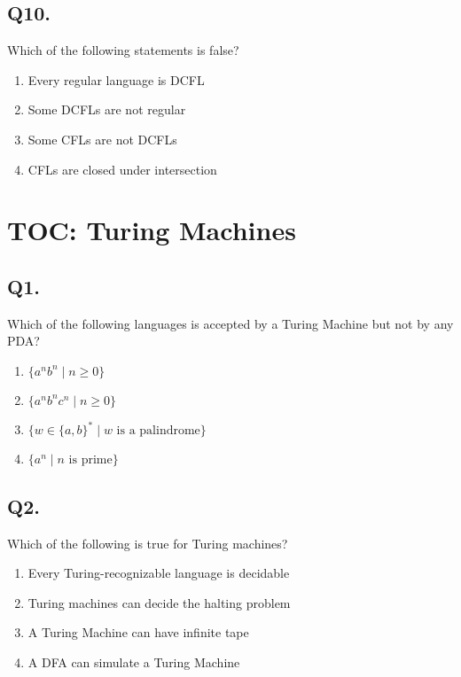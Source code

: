 \vspace{1em}

\subsection*{Q10.}
Which of the following statements is false?

\begin{enumerate}[label=(\alph*)]
    \item Every regular language is DCFL  
    \item Some DCFLs are not regular  
    \item Some CFLs are not DCFLs  
    \item CFLs are closed under intersection  
\end{enumerate}


\section{TOC: Turing Machines}

\subsection*{Q1.}
Which of the following languages is accepted by a Turing Machine but not by any PDA?

\begin{enumerate}[label=(\alph*)]
    \item $\{a^n b^n \mid n \geq 0\}$  
    \item $\{a^n b^n c^n \mid n \geq 0\}$  
    \item $\{w \in \{a, b\}^* \mid w \text{ is a palindrome} \}$  
    \item $\{a^n \mid n \text{ is prime} \}$  
\end{enumerate}

\vspace{1em}

\subsection*{Q2.}
Which of the following is true for Turing machines?

\begin{enumerate}[label=(\alph*)]
    \item Every Turing-recognizable language is decidable  
    \item Turing machines can decide the halting problem  
    \item A Turing Machine can have infinite tape  
    \item A DFA can simulate a Turing Machine  
\end{enumerate}

